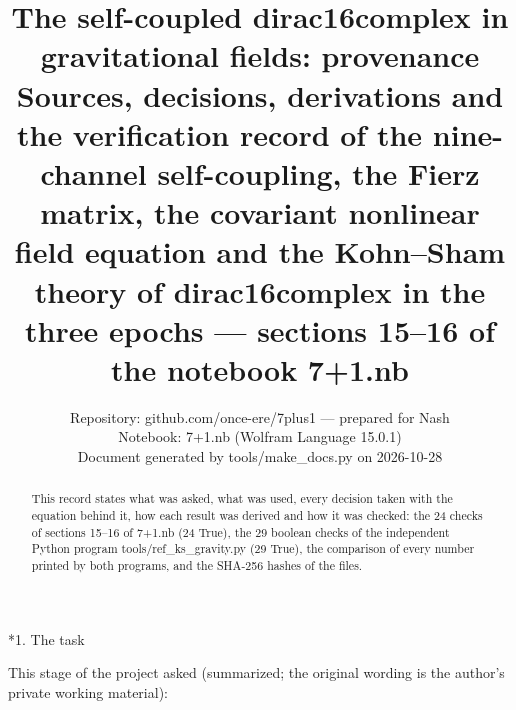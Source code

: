 \documentclass[10pt,a4paper]{article}
\makeatletter
\renewcommand\section{\@startsection{section}{1}{\z@}{-3.5ex \@plus -1ex \@minus -.2ex}{2.3ex \@plus.2ex}{\normalfont\Large\bfseries\raggedright}}
\makeatother
\begin{document}
\title{The self-coupled dirac16complex in gravitational fields: provenance\\[0.4em]\large Sources, decisions, derivations and the verification record of the nine-channel self-coupling, the Fierz matrix, the covariant nonlinear field equation and the Kohn–Sham theory of dirac16complex in the three epochs — sections 15–16 of the notebook 7+1.nb}
\author{Repository: github.com/once-ere/7plus1 — prepared for Nash\\ Notebook: 7+1.nb (Wolfram Language 15.0.1)\\ Document generated by tools/make\_docs.py on 2026-10-28}
\date{}
\maketitle
\begin{abstract}
This record states what was asked, what was used, every decision taken with the equation behind it, how each result was derived and how it was checked: the 24 checks of sections 15–16 of 7+1.nb (24 True), the 29 boolean checks of the independent Python program tools/ref\_ks\_gravity.py (29 True), the comparison of every number printed by both programs, and the SHA-256 hashes of the files.
\end{abstract}
\tableofcontents
{}\section*{1. The task}
This stage of the project asked (summarized; the original wording is the author’s private working material):
\end{document}
